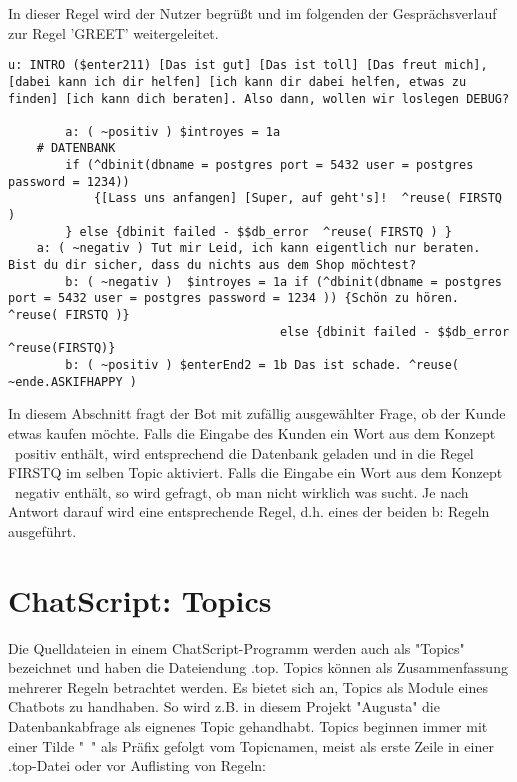 In dieser Regel wird der Nutzer begrüßt und im folgenden der Gesprächsverlauf zur Regel 'GREET' weitergeleitet.

\begin{lstlisting}[caption={Beispiel für Gesprächsablauf mit Antworten u:, a: und b:}]
 u: INTRO ($enter211) [Das ist gut] [Das ist toll] [Das freut mich], [dabei kann ich dir helfen] [ich kann dir dabei helfen, etwas zu finden] [ich kann dich beraten]. Also dann, wollen wir loslegen DEBUG?

		a: ( ~positiv ) $introyes = 1a
	# DATENBANK
	    if (^dbinit(dbname = postgres port = 5432 user = postgres password = 1234))
	        {[Lass uns anfangen] [Super, auf geht's]!  ^reuse( FIRSTQ )
	    } else {dbinit failed - $$db_error  ^reuse( FIRSTQ ) }
	a: ( ~negativ ) Tut mir Leid, ich kann eigentlich nur beraten. Bist du dir sicher, dass du nichts aus dem Shop möchtest?
		b: ( ~negativ )  $introyes = 1a if (^dbinit(dbname = postgres port = 5432 user = postgres password = 1234 )) {Schön zu hören. ^reuse( FIRSTQ )}
                                      else {dbinit failed - $$db_error ^reuse(FIRSTQ)}
	    b: ( ~positiv ) $enterEnd2 = 1b Das ist schade. ^reuse( ~ende.ASKIFHAPPY )
\end{lstlisting}

In diesem Abschnitt fragt der Bot mit zufällig ausgewählter Frage, ob der Kunde etwas kaufen möchte. Falls die Eingabe des Kunden ein Wort aus dem Konzept ~positiv enthält, wird entsprechend die Datenbank geladen und in die Regel FIRSTQ im selben Topic aktiviert. Falls die Eingabe ein Wort aus dem Konzept ~negativ enthält, so wird gefragt, ob man nicht wirklich was sucht. Je nach Antwort darauf wird eine entsprechende Regel, d.h. eines der beiden b: Regeln ausgeführt. 

\section{ChatScript: Topics}
\label{sec:ChatScript: Topics}

Die Quelldateien in einem ChatScript-Programm werden auch als "Topics" bezeichnet und haben die Dateiendung .top. Topics können als Zusammenfassung mehrerer Regeln betrachtet werden. Es bietet sich an, Topics als Module eines Chatbots zu handhaben. So wird z.B. in diesem Projekt "Augusta" die Datenbankabfrage als eignenes Topic gehandhabt.
Topics beginnen immer mit einer Tilde "~" als Präfix gefolgt vom Topicnamen, meist als erste Zeile in einer .top-Datei oder vor Auflisting von Regeln:

